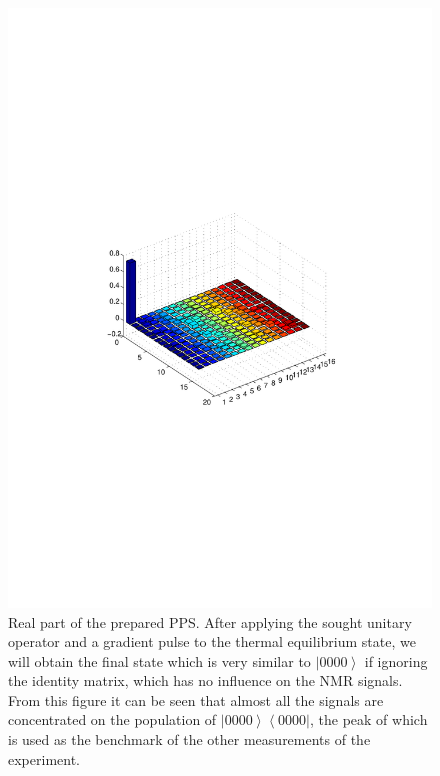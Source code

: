 \documentclass[6pt]{rspublic}
\begin{document}
\begin{figure}[h]
\centering
\begin{minipage}[c]{.6\textwidth}
\centering
\includegraphics[width=\textwidth]{bar.pdf}
\end{minipage}%
\hspace{.05\textwidth}
\begin{minipage}[c]{.3\textwidth}
\centering
\caption{\footnotesize{Real part of the prepared PPS. After applying the sought unitary operator and a gradient pulse to the thermal equilibrium state, we will obtain the final state which is very similar to $\left\vert 0000 \right\rangle$ if ignoring the identity matrix, which has no influence on the NMR signals. From this figure it can be seen that almost all the signals are concentrated on the population of  $\left\vert 0000 \right\rangle \left\langle 0000 \right\vert$, the peak of which is used as the benchmark of the other measurements of the experiment.}}
\label{pps}
\end{minipage}
\end{figure}
\end{document}
